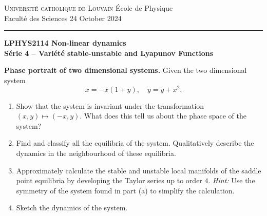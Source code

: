 \documentclass{article}
\begin{document}
\noindent
{\textsc{Universit\'e catholique de Louvain}} \hfill \'Ecole de Physique\\
Facult\'e des Sciences \hfill 24 October 2024\\
\hrule

\bigskip

\begin{center}
  \textbf{LPHYS2114 Non-linear dynamics}\\
  \textbf{S\'erie 4 -- Vari\'et\'e stable-unstable and Lyapunov Functions} 
\end{center}

{}

\begin{question}
  \textbf{Phase portrait of two dimensional systems.} Given the two dimensional system
  \begin{equation}
    \dot x = - x(1+y), \quad \dot y = y+x^2.
    \label{eqn:2DSystem}
  \end{equation}
  \begin{enumerate}[label=(\alph*)]
  
    \item Show that the system is invariant under the transformation $(x,y)\mapsto (-x,y)$. What does this tell us about the phase space of the system?

    \item Find and classify all the equilibria of the system. Qualitatively describe the dynamics in the neighbourhood of these equilibria.
    
    \item Approximately calculate the stable and unstable local manifolds of the saddle point equilibria by developing the Taylor series up to order $4$. \textit{Hint:} Use the symmetry of the system found in part (a) to simplify the calculation.

    \item Sketch the dynamics of the system.  
\end{enumerate}
\end{question}
\end{document}
